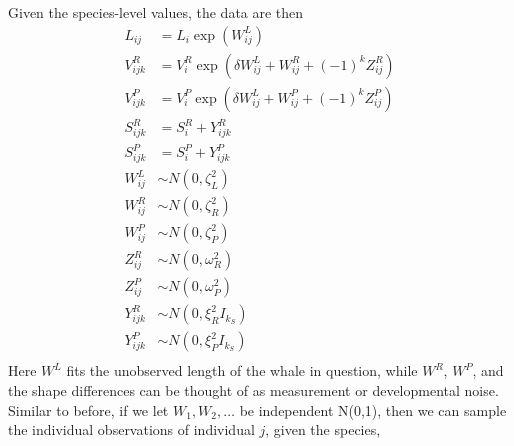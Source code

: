 \documentclass{article}
\begin{document}
Given the species-level values,
the data are then
\begin{align}
    L_{ij} &=  L_i \exp( W^L_{ij} ) \\
    V^R_{ijk} &=  V^R_i \exp( \delta W^L_{ij} + W^R_{ij} + (-1)^k Z^R_{ij} ) \\
    V^P_{ijk} &=  V^P_i \exp( \delta W^L_{ij} + W^P_{ij} + (-1)^k Z^P_{ij} ) \\
    S^R_{ijk} &= S^R_i + Y^R_{ijk} \\
    S^P_{ijk} &= S^P_i + Y^P_{ijk} \\
    W^L_{ij} &\sim N(0,\zeta^2_L) \\
    W^R_{ij} &\sim N(0,\zeta^2_{R}) \\
    W^P_{ij} &\sim N(0,\zeta^2_{P}) \\
    Z^R_{ij} &\sim N(0,\omega^2_{R}) \\
    Z^P_{ij} &\sim N(0,\omega^2_{P}) \\
    Y^R_{ijk} &\sim N(0,\xi^2_R I_{k_S}) \\
    Y^P_{ijk} &\sim N(0,\xi^2_P I_{k_S}) \\
\end{align}
Here $W^L$ fits the unobserved length of the whale in question,
while $W^R$, $W^P$, and the shape differences can be thought of as measurement or developmental noise.
Similar to before, if we let $W_1, W_2, \ldots$ be independent N(0,1), 
then we can sample the individual observations of individual $j$, given the species, 
\end{document}
